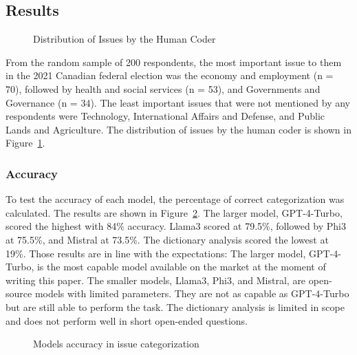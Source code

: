 \documentclass[
  authoryear,
  preprint,
  3p]{elsarticle}
\begin{document}
\subsection{Results}\label{results}

\begin{figure}[H]


\caption{\label{fig-distribution}Distribution of Issues by the Human
Coder}

\end{figure}%

From the random sample of 200 respondents, the most important issue to
them in the 2021 Canadian federal election was the economy and
employment (n = 70), followed by health and social services (n = 53),
and Governments and Governance (n = 34). The least important issues that
were not mentioned by any respondents were Technology, International
Affairs and Defense, and Public Lands and Agriculture. The distribution
of issues by the human coder is shown in Figure~\ref{fig-distribution}.

\subsubsection{Accuracy}\label{accuracy}

To test the accuracy of each model, the percentage of correct
categorization was calculated. The results are shown in
Figure~\ref{fig-accuracy}. The larger model, GPT-4-Turbo, scored the
highest with 84\% accuracy. Llama3 scored at 79.5\%, followed by Phi3 at
75.5\%, and Mistral at 73.5\%. The dictionary analysis scored the lowest
at 19\%. Those results are in line with the expectations: The larger
model, GPT-4-Turbo, is the most capable model available on the market at
the moment of writing this paper. The smaller models, Llama3, Phi3, and
Mistral, are open-source models with limited parameters. They are not as
capable as GPT-4-Turbo but are still able to perform the task. The
dictionary analysis is limited in scope and does not perform well in
short open-ended questions.

\begin{figure}[H]


\caption{\label{fig-accuracy}Models accuracy in issue categorization}

\end{figure}%
\end{document}
